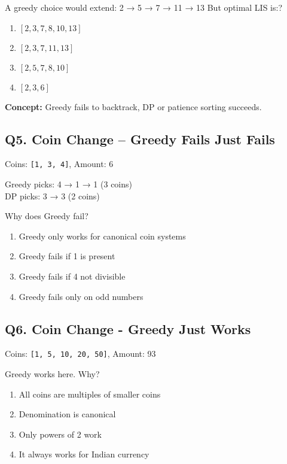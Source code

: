 A greedy choice would extend: 2 → 5 → 7 → 11 → 13  
But optimal LIS is:?

\begin{enumerate}[label=(\alph*)]
    \item $[2, 3, 7, 8, 10, 13]$ 
    \item $[2, 3, 7, 11, 13]$ 
    \item $[2, 5, 7, 8, 10]$ 
    \item $[2, 3, 6]$
\end{enumerate}

\textbf{Concept:} Greedy fails to backtrack, DP or patience sorting succeeds.


\subsection*{Q5. Coin Change – Greedy Fails Just Fails}
Coins: \texttt{[1, 3, 4]}, Amount: 6

\begin{center}
Greedy picks: 4 → 1 → 1 (3 coins) \\ 
DP picks: 3 → 3 (2 coins)
\end{center}

Why does Greedy fail?

\begin{enumerate}[label=(\alph*)]
    \item Greedy only works for canonical coin systems 
    \item Greedy fails if 1 is present 
    \item Greedy fails if 4 not divisible 
    \item Greedy fails only on odd numbers
\end{enumerate}


\subsection*{Q6. Coin Change - Greedy Just Works}
Coins: \texttt{[1, 5, 10, 20, 50]}, Amount: 93

Greedy works here.  
Why?

\begin{enumerate}[label=(\alph*)]
    \item All coins are multiples of smaller coins 
    \item Denomination is canonical 
    \item Only powers of 2 work 
    \item It always works for Indian currency
\end{enumerate}


